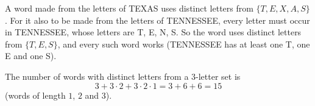 A word made from the letters of TEXAS uses distinct letters from $\{T,E,X,A,S\}$. For it also to be made from the letters of TENNESSEE, every letter must occur in TENNESSEE, whose letters are T, E, N, S. So the word uses distinct letters from $\{T,E,S\}$, and every such word works (TENNESSEE has at least one T, one E and one S).

The number of words with distinct letters from a $3$-letter set is
\[3+3\cdot2+3\cdot2\cdot1=3+6+6=\boxed{15}\]
(words of length $1$, $2$ and $3$).
